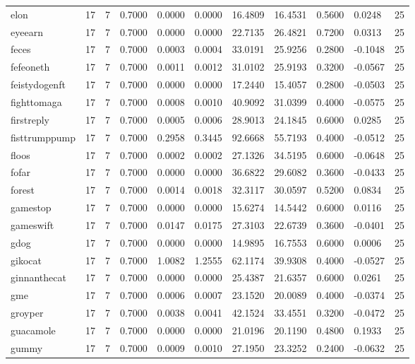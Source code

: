 \begin{table}[htbp]
\begin{tabular}{lllllllllll}
elon & 17 & 7 & 0.7000 & 0.0000 & 0.0000 & 16.4809 & 16.4531 & 0.5600 & 0.0248 & 25 \\
eyeearn & 17 & 7 & 0.7000 & 0.0000 & 0.0000 & 22.7135 & 26.4821 & 0.7200 & 0.0313 & 25 \\
feces & 17 & 7 & 0.7000 & 0.0003 & 0.0004 & 33.0191 & 25.9256 & 0.2800 & -0.1048 & 25 \\
fefeoneth & 17 & 7 & 0.7000 & 0.0011 & 0.0012 & 31.0102 & 25.9193 & 0.3200 & -0.0567 & 25 \\
feistydogenft & 17 & 7 & 0.7000 & 0.0000 & 0.0000 & 17.2440 & 15.4057 & 0.2800 & -0.0503 & 25 \\
fighttomaga & 17 & 7 & 0.7000 & 0.0008 & 0.0010 & 40.9092 & 31.0399 & 0.4000 & -0.0575 & 25 \\
firstreply & 17 & 7 & 0.7000 & 0.0005 & 0.0006 & 28.9013 & 24.1845 & 0.6000 & 0.0285 & 25 \\
fisttrumppump & 17 & 7 & 0.7000 & 0.2958 & 0.3445 & 92.6668 & 55.7193 & 0.4000 & -0.0512 & 25 \\
floos & 17 & 7 & 0.7000 & 0.0002 & 0.0002 & 27.1326 & 34.5195 & 0.6000 & -0.0648 & 25 \\
fofar & 17 & 7 & 0.7000 & 0.0000 & 0.0000 & 36.6822 & 29.6082 & 0.3600 & -0.0433 & 25 \\
forest & 17 & 7 & 0.7000 & 0.0014 & 0.0018 & 32.3117 & 30.0597 & 0.5200 & 0.0834 & 25 \\
gamestop & 17 & 7 & 0.7000 & 0.0000 & 0.0000 & 15.6274 & 14.5442 & 0.6000 & 0.0116 & 25 \\
gameswift & 17 & 7 & 0.7000 & 0.0147 & 0.0175 & 27.3103 & 22.6739 & 0.3600 & -0.0401 & 25 \\
gdog & 17 & 7 & 0.7000 & 0.0000 & 0.0000 & 14.9895 & 16.7553 & 0.6000 & 0.0006 & 25 \\
gikocat & 17 & 7 & 0.7000 & 1.0082 & 1.2555 & 62.1174 & 39.9308 & 0.4000 & -0.0527 & 25 \\
ginnanthecat & 17 & 7 & 0.7000 & 0.0000 & 0.0000 & 25.4387 & 21.6357 & 0.6000 & 0.0261 & 25 \\
gme & 17 & 7 & 0.7000 & 0.0006 & 0.0007 & 23.1520 & 20.0089 & 0.4000 & -0.0374 & 25 \\
groyper & 17 & 7 & 0.7000 & 0.0038 & 0.0041 & 42.1524 & 33.4551 & 0.3200 & -0.0472 & 25 \\
guacamole & 17 & 7 & 0.7000 & 0.0000 & 0.0000 & 21.0196 & 20.1190 & 0.4800 & 0.1933 & 25 \\
gummy & 17 & 7 & 0.7000 & 0.0009 & 0.0010 & 27.1950 & 23.3252 & 0.2400 & -0.0632 & 25 \\

\end{tabular}
\end{table}
